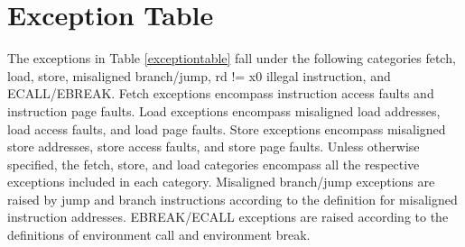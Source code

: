 \documentclass[12pt]{article}
\begin{document}
\section{Exception Table}
The exceptions in Table \ref{exceptiontable} fall under the following categories fetch, load, store, misaligned branch/jump, rd != x0 illegal instruction, and ECALL/EBREAK. Fetch exceptions encompass instruction access faults and instruction page faults. Load exceptions encompass misaligned load addresses, load access faults, and load page faults. Store exceptions encompass misaligned store addresses, store access faults, and store page faults. Unless otherwise specified, the fetch, store, and load categories encompass all the respective exceptions included in each category. Misaligned branch/jump exceptions are raised by jump and branch instructions according to the definition for misaligned instruction addresses. EBREAK/ECALL exceptions are raised according to the definitions of environment call and environment break.
\end{document}
